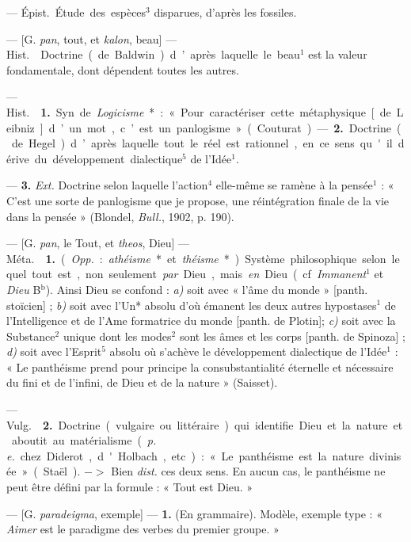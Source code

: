 
	\begin{itemize}[leftmargin=1cm, label=, itemsep=1pt]

 — \si{Épist.} Étude des
espèces$^3$ disparues, d'après les fossiles.

 — [G. {\it pan}, tout, et {\it kalon}, beau] — \si{Hist.}
 Doctrine (de Baldwin) d’après laquelle le beau$^1$ est la
valeur fondamentale, dont dépendent toutes les autres.

 — \si{Hist.}  {\bf 1.} Syn. de
{\it Logicisme}* : « Pour caractériser cette métaphysique [de Leibniz] d’un
mot, c’est un panlogisme » (Couturat). —  {\bf 2.} Doctrine (de Hegel)
d’après laquelle tout le réel est rationnel, en ce sens qu'il dérive du
développement dialectique$^5$ de l’Idée$^1$.

— {\bf 3.} {\it Ext.}  Doctrine selon laquelle l’action$^4$
elle-même se ramène à la pensée$^1$ : « C’est une sorte de panlogisme que je
propose, une réintégration finale de la vie dans la pensée » (Blondel, {\it
Bull.}, 1902, p. 190).

 — [G. {\it pan}, le Tout, et {\it theos}, Dieu] — \si{Méta.}
 {\bf 1.} ({\it Opp.} : {\it athéisme}* et {\it théisme}*).
Système philosophique selon lequel tout est, non seulement {\it par} Dieu,
mais {\it en} Dieu (cf. {\it Immanent}$^1$ et {\it Dieu} B$^\text{b}$). Ainsi
Dieu se confond : {\it a)} soit avec « l'âme du monde » [panth. stoïcien] ;
{\it b)} soit avec l’Un* absolu d’où émanent les
deux autres hypostases$^1$ de l’Intelligence et de l’Ame formatrice du monde
[panth. de Plotin]; {\it c)} soit avec la Substance$^2$ unique dont les
modes$^2$ sont les âmes et les corps [panth. de Spinoza] ; {\it d)} soit avec
l'Esprit$^5$ absolu où s'achève le développement dialectique de l’Idée$^1$ :
« Le panthéisme prend pour principe la consubstantialité éternelle et
nécessaire du fini et de l'infini, de Dieu et de la nature » (Saisset).

— \si{Vulg.}  {\bf 2.} Doctrine (vulgaire ou littéraire) qui
identifie Dieu et la nature et aboutit au matérialisme ({\it p. e.} chez
Diderot, d'Holbach, etc.) : « Le panthéisme est la nature divinisée
» (Staël). $->$ Bien {\it dist.} ces deux sens. En aucun cas, le panthéisme
ne peut être défini par la formule : « Tout est Dieu. »

 — [G. {\it paradeigma}, exemple] — {\bf 1.} (En grammaire).
Modèle, exemple type : « {\it Aimer} est le paradigme des verbes du premier
groupe. »


\end{itemize}
